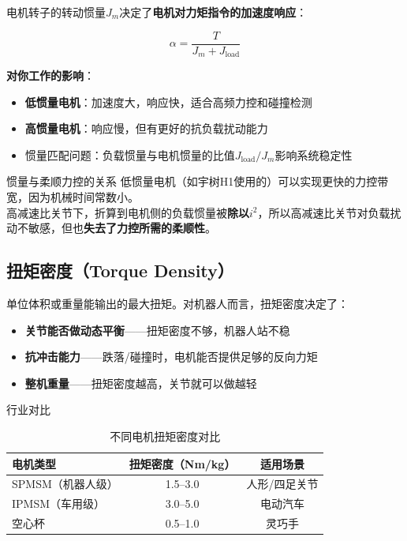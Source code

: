 电机转子的转动惯量$J_m$决定了\textbf{电机对力矩指令的加速度响应}：

\begin{equation}
\alpha = \frac{T}{J_m + J_{\text{load}}}
\end{equation}

\textbf{对你工作的影响}：

\begin{itemize}
  \item \textbf{低惯量电机}：加速度大，响应快，适合高频力控和碰撞检测
  \item \textbf{高惯量电机}：响应慢，但有更好的抗负载扰动能力
  \item 惯量匹配问题：负载惯量与电机惯量的比值$J_{\text{load}}/J_m$影响系统稳定性
\end{itemize}

\begin{engineeringbox}{惯量与柔顺力控的关系}
低惯量电机（如宇树H1使用的）可以实现更快的力控带宽，因为机械时间常数小。\\
高减速比关节下，折算到电机侧的负载惯量被\textbf{除以$i^2$}，所以高减速比关节对负载扰动不敏感，但也\textbf{失去了力控所需的柔顺性}。
\end{engineeringbox}

\subsection{扭矩密度（Torque Density）}

单位体积或重量能输出的最大扭矩。对机器人而言，扭矩密度决定了：

\begin{itemize}
  \item \textbf{关节能否做动态平衡}——扭矩密度不够，机器人站不稳
  \item \textbf{抗冲击能力}——跌落/碰撞时，电机能否提供足够的反向力矩
  \item \textbf{整机重量}——扭矩密度越高，关节就可以做越轻
\end{itemize}

\begin{industrybox}{行业对比}
\begin{table}[H]
\centering
\begin{tabular}{lcc}
\toprule
\textbf{电机类型} & \textbf{扭矩密度（Nm/kg）} & \textbf{适用场景} \\
\midrule
SPMSM（机器人级） & 1.5--3.0 & 人形/四足关节 \\
IPMSM（车用级） & 3.0--5.0 & 电动汽车 \\
空心杯 & 0.5--1.0 & 灵巧手 \\
\bottomrule
\end{tabular}
\caption{不同电机扭矩密度对比}
\label{tab:torque_density}
\end{table}
\end{industrybox}

